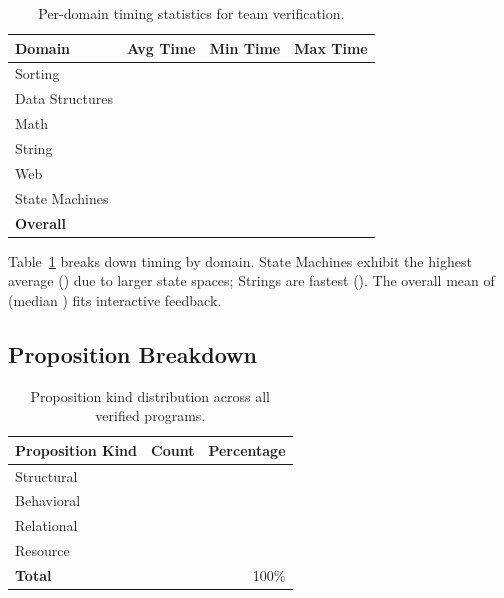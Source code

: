 \documentclass[11pt]{article}
\begin{document}
\begin{table}[t]
\centering
\caption{Per-domain timing statistics for team verification.}
\label{tab:domain-timing}
\begin{tabular}{lrrr}
\toprule
\textbf{Domain} & \textbf{Avg Time} & \textbf{Min Time} & \textbf{Max Time} \\
\midrule
Sorting         & \suppDomainSortAvgTime{} & \suppDomainSortMinTime{}
                & \suppDomainSortMaxTime{} \\
Data Structures & \suppDomainDsAvgTime{} & \suppDomainDsMinTime{}
                & \suppDomainDsMaxTime{} \\
Math            & \suppDomainMathAvgTime{} & \suppDomainMathMinTime{}
                & \suppDomainMathMaxTime{} \\
String          & \suppDomainStrAvgTime{} & \suppDomainStrMinTime{}
                & \suppDomainStrMaxTime{} \\
Web             & \suppDomainWebAvgTime{} & \suppDomainWebMinTime{}
                & \suppDomainWebMaxTime{} \\
State Machines  & \suppDomainSmAvgTime{} & \suppDomainSmMinTime{}
                & \suppDomainSmMaxTime{} \\
\midrule
\textbf{Overall}& \expTimeMean{} & \expTimeMin{} & \expTimeMax{} \\
\bottomrule
\end{tabular}
\end{table}

Table~\ref{tab:domain-timing} breaks down timing by domain.
State Machines exhibit the highest average (\suppDomainSmAvgTime{}) due to
larger state spaces; Strings are fastest (\suppDomainStrAvgTime{}). The overall
mean of \expTimeMean{} (median \expTimeMedian{}) fits interactive feedback.

\subsection{Proposition Breakdown}

\begin{table}[t]
\centering
\caption{Proposition kind distribution across all verified programs.}
\label{tab:prop-breakdown}
\begin{tabular}{lrr}
\toprule
\textbf{Proposition Kind} & \textbf{Count} & \textbf{Percentage} \\
\midrule
Structural  & \suppPropStructuralCount{} & \suppPropStructuralPct{} \\
Behavioral  & \suppPropBehavioralCount{} & \suppPropBehavioralPct{} \\
Relational  & \suppPropRelationalCount{} & \suppPropRelationalPct{} \\
Resource    & \suppPropResourceCount{} & \suppPropResourcePct{} \\
\midrule
\textbf{Total} & \suppPropTotal{} & 100\% \\
\bottomrule
\end{tabular}
\end{table}
\end{document}
